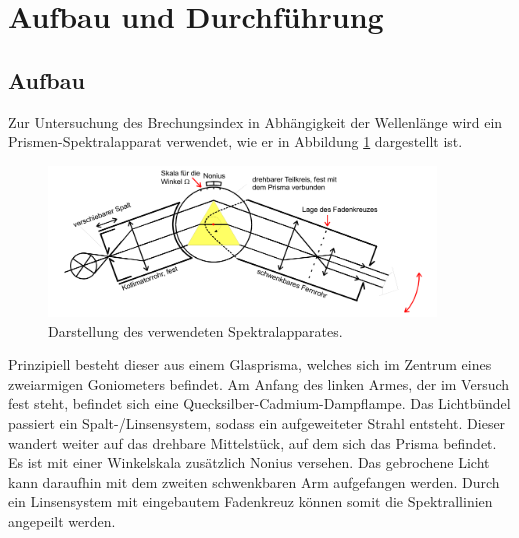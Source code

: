 \section{Aufbau und Durchführung}
\subsection{Aufbau}
\label{sec:Aufbau}
Zur Untersuchung des Brechungsindex in Abhängigkeit der Wellenlänge wird ein Prismen-Spektralapparat verwendet, wie er in Abbildung \ref{fig:1} dargestellt ist.

\begin{figure}[H]
  \centering
  \includegraphics[height=4cm]{ressources/aufbau.png}
  \caption{Darstellung des verwendeten Spektralapparates. \cite{skript}}
  \label{fig:1}
\end{figure}

Prinzipiell besteht dieser aus einem Glasprisma, welches sich im Zentrum eines zweiarmigen Goniometers befindet.
Am Anfang des linken Armes, der im Versuch fest steht, befindet sich eine Quecksilber-Cadmium-Dampflampe.
Das Lichtbündel passiert ein Spalt-/Linsensystem, sodass ein aufgeweiteter Strahl entsteht.
Dieser wandert weiter auf das drehbare Mittelstück, auf dem sich das Prisma befindet.
Es ist mit einer Winkelskala zusätzlich Nonius versehen.
Das gebrochene Licht kann daraufhin mit dem zweiten schwenkbaren Arm aufgefangen werden.
Durch ein Linsensystem mit eingebautem Fadenkreuz können somit die Spektrallinien angepeilt werden.
